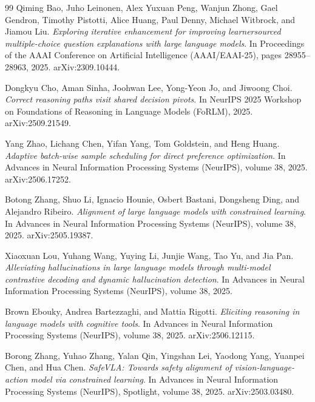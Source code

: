 \begin{thebibliography}{99}
Qiming Bao, Juho Leinonen, Alex Yuxuan Peng, Wanjun Zhong, Gael Gendron, Timothy Pistotti, Alice Huang, Paul Denny, Michael Witbrock, and Jiamou Liu.
\textit{Exploring iterative enhancement for improving learnersourced multiple-choice question explanations with large language models}.
In Proceedings of the AAAI Conference on Artificial Intelligence (AAAI/EAAI-25), pages 28955--28963, 2025.
arXiv:2309.10444.

Dongkyu Cho, Aman Sinha, Joohwan Lee, Yong-Yeon Jo, and Jiwoong Choi.
\textit{Correct reasoning paths visit shared decision pivots}.
In NeurIPS 2025 Workshop on Foundations of Reasoning in Language Models (FoRLM), 2025.
arXiv:2509.21549.

Yang Zhao, Lichang Chen, Yifan Yang, Tom Goldstein, and Heng Huang.
\textit{Adaptive batch-wise sample scheduling for direct preference optimization}.
In Advances in Neural Information Processing Systems (NeurIPS), volume 38, 2025.
arXiv:2506.17252.

Botong Zhang, Shuo Li, Ignacio Hounie, Osbert Bastani, Dongsheng Ding, and Alejandro Ribeiro.
\textit{Alignment of large language models with constrained learning}.
In Advances in Neural Information Processing Systems (NeurIPS), volume 38, 2025.
arXiv:2505.19387.

Xiaoxuan Lou, Yuhang Wang, Yuying Li, Junjie Wang, Tao Yu, and Jia Pan.
\textit{Alleviating hallucinations in large language models through multi-model contrastive decoding and dynamic hallucination detection}.
In Advances in Neural Information Processing Systems (NeurIPS), volume 38, 2025.

Brown Ebouky, Andrea Bartezzaghi, and Mattia Rigotti.
\textit{Eliciting reasoning in language models with cognitive tools}.
In Advances in Neural Information Processing Systems (NeurIPS), volume 38, 2025.
arXiv:2506.12115.

Borong Zhang, Yuhao Zhang, Yalan Qin, Yingshan Lei, Yaodong Yang, Yuanpei Chen, and Hua Chen.
\textit{SafeVLA: Towards safety alignment of vision-language-action model via constrained learning}.
In Advances in Neural Information Processing Systems (NeurIPS), Spotlight, volume 38, 2025.
arXiv:2503.03480.

\end{thebibliography}
